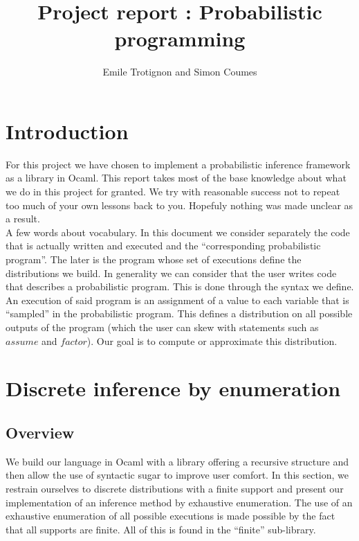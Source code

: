 \documentclass{article}
\title{Project report : Probabilistic programming}
\author{Emile Trotignon and Simon Coumes}
\begin{document}
\maketitle

\section{Introduction}

	For this project we have chosen to implement a probabilistic inference framework as a library in Ocaml.
	This report takes most of the base knowledge about what we do in this project for granted.
	We try with reasonable success not to repeat too much of your own lessons back to you. 
	Hopefuly nothing was made unclear as a result. \\

	A few words about vocabulary.
	In this document we consider separately the code that is actually written and executed and the ``corresponding probabilistic program''.
	The later is the program whose set of executions define the distributions we build.
	In generality we can consider that the user writes code that describes a probabilistic program. 
	This is done through the syntax we define.
	An execution of said program is an assignment of a value to each variable that is ``sampled'' in the probabilistic program. 
	This defines a distribution on all possible outputs of the program (which the user can skew with statements such as $assume$ and $factor$). Our goal is to compute or approximate this distribution. 

\section{Discrete inference by enumeration}

	\subsection{Overview}

	We build our language in Ocaml with a library offering a recursive structure and then allow the use of syntactic sugar to improve user comfort.
	In this section, we restrain ourselves to discrete distributions with a finite support and present our implementation of an inference method by exhaustive enumeration.
	The use of an exhaustive enumeration of all possible executions is made possible by the fact that all supports are finite.
	All of this is found in the ``finite'' sub-library.
\end{document}
